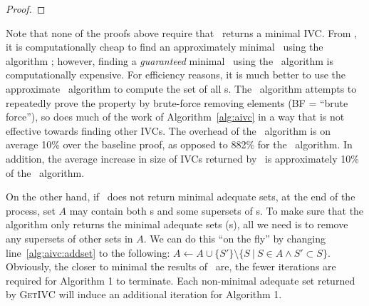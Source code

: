 \begin{proof}
%
%
%
\end{proof}

Note that none of the proofs above require that \getivc\ returns a minimal IVC.
From \cite{Ghass16}, it is computationally cheap to find an
approximately minimal \ivc\ using the algorithm \ucalg; however, finding a {\em guaranteed}
minimal \ivc\ using the \ucbfalg\ algorithm is computationally expensive.  For efficiency
reasons, it is much better to use the approximate \ucalg\ algorithm to compute the set of
all \mivc s.  The \ucbfalg\ algorithm attempts to repeatedly prove the property by brute-force removing elements (BF = ``brute force''), so does much of the work of Algorithm~\ref{alg:aivc} in a way that is not effective towards finding other IVCs.  The overhead of the \ucalg\ algorithm is on average 10\% over the baseline proof, as opposed to 882\% for the \ucbfalg\ algorithm.  In addition, the average increase in size of IVCs returned by \ucalg\ is approximately 10\% of the \ucbfalg\ algorithm.

On the other hand, if \getivc ~does not return minimal adequate sets, at the end of the process,
set $A$ may contain both \mivc s and some supersets of \mivc s. To make sure that the algorithm only returns
the minimal adequate sets (\mivc s), all we need is to remove any supersets of other sets in $A$.  We can do this ``on the fly'' by changing
line~\ref{alg:aivc:addset} to the following:
$A \leftarrow A \cup \{S'\} \setminus \{ S~|~S \in A \wedge S' \subset S \}$.
Obviously, the closer to minimal the results of \getivc ~are,
the fewer iterations are required for Algorithm 1 to terminate.  Each non-minimal adequate set returned by \textsc{GetIVC} will induce an additional iteration for Algorithm 1.



%



